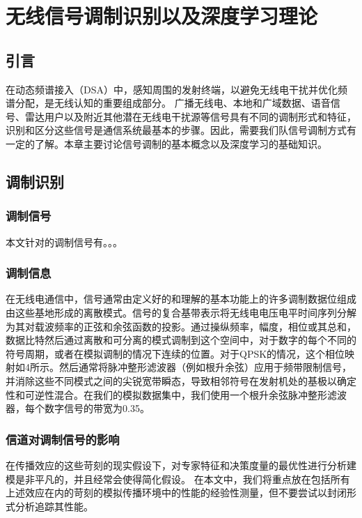 
\chapter{无线信号调制识别以及深度学习理论}
\label{chap: mod_rec_deep_learning_theo}
\section{引言}
在动态频谱接入（DSA）中，感知周围的发射终端，以避免无线电干扰并优化频谱分配，是无线认知的重要组成部分。 广播无线电、本地和广域数据、语音信号、雷达用户以及附近其他潜在无线电干扰源等信号具有不同的调制形式和特征，识别和区分这些信号是通信系统最基本的步骤。因此，需要我们队信号调制方式有一定的了解。本章主要讨论信号调制的基本概念以及深度学习的基础知识。
\section{调制识别}

\subsection{调制信号}
\label{sec:mod_signal}
本文针对的调制信号有。。。

\subsection{调制信息}
在无线电通信中，信号通常由定义好的和理解的基本功能上的许多调制数据位组成由这些基地形成的离散模式。信号的复合基带表示将无线电电压电平时间序列分解为其对载波频率的正弦和余弦函数的投影。通过操纵频率，幅度，相位或其总和，数据比特然后通过离散和可分离的模式调制到这个空间中，对于数字的每个不同的符号周期，或者在模拟调制的情况下连续的位置。对于QPSK的情况，这个相位映射如4所示。然后通常将脉冲整形滤波器（例如根升余弦）应用于频带限制信号，并消除这些不同模式之间的尖锐宽带瞬态，导致相邻符号在发射机处的基极以确定性和可逆性混合。在我们的模拟数据集中，我们使用一个根升余弦脉冲整形滤波器，每个数字信号的带宽为0.35。\par

\subsection{信道对调制信号的影响}
在传播效应的这些苛刻的现实假设下，对专家特征和决策度量的最优性进行分析建模是非平凡的，并且经常会使得简化假设。 在本文中，我们将重点放在包括所有上述效应在内的苛刻的模拟传播环境中的性能的经验性测量，但不要尝试以封闭形式分析追踪其性能。\par

